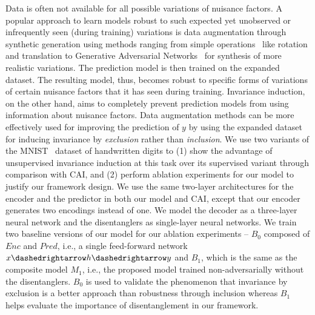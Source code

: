 Data is often not available for all possible variations of nuisance factors. A popular approach to learn models robust to such expected yet unobserved or infrequently seen (during training) variations is data augmentation through synthetic generation using methods ranging from simple operations~\cite{bib:data_aug_1} like rotation and translation to Generative Adversarial Networks~\cite{bib:gan_aug,bib:gan} for synthesis of more realistic variations. The prediction model is then trained on the expanded dataset. The resulting model, thus, becomes robust to specific forms of variations of certain nuisance factors that it has seen during training. Invariance induction, on the other hand, aims to completely prevent prediction models from using information about nuisance factors. Data augmentation methods can be more effectively used for improving the prediction of $y$ by using the expanded dataset for inducing invariance by \emph{exclusion} rather than \emph{inclusion}. We use two variants of the MNIST~\cite{bib:mnist} dataset of handwritten digits to (1) show the advantage of unsupervised invariance induction at this task over its supervised variant through comparison with CAI, and (2) perform ablation experiments for our model to justify our framework design. We use the same two-layer architectures for the encoder and the predictor in both our model and CAI, except that our encoder generates two encodings instead of one. We model the decoder as a three-layer neural network and the disentanglers as single-layer neural networks. We train two baseline versions of our model for our ablation experiments -- $B_0$ composed of $Enc$ and $Pred$, i.e., a single feed-forward network $x \dashedrightarrow h \dashedrightarrow y$ and $B_1$, which is the same as the composite model $M_1$, i.e., the proposed model trained non-adversarially without the disentanglers. $B_0$ is used to validate the phenomenon that invariance by exclusion is a better approach than robustness through inclusion whereas $B_1$ helps evaluate the importance of disentanglement in our framework.




